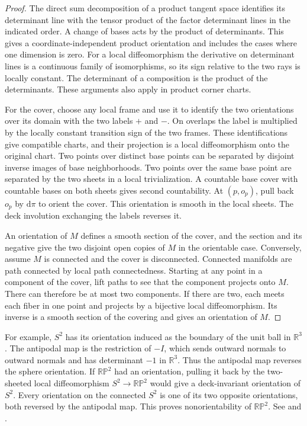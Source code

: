 \documentclass[11pt,oneside,openany]{book}
\theoremstyle{definition}
\theoremstyle{remark}
\newcommand{\R}{\mathbb R}
\newcommand{\dd}{\mathrm d}
\begin{document}
\begin{proof}
The direct sum decomposition of a product tangent space identifies its determinant line with the tensor product of the factor determinant lines in the indicated order. A change of bases acts by the product of determinants. This gives a coordinate-independent product orientation and includes the cases where one dimension is zero. For a local diffeomorphism the derivative on determinant lines is a continuous family of isomorphisms, so its sign relative to the two rays is locally constant. The determinant of a composition is the product of the determinants. These arguments also apply in product corner charts.

For the cover, choose any local frame and use it to identify the two orientations over its domain with the two labels \(+\) and \(-\). On overlaps the label is multiplied by the locally constant transition sign of the two frames. These identifications give compatible charts, and their projection is a local diffeomorphism onto the original chart. Two points over distinct base points can be separated by disjoint inverse images of base neighborhoods. Two points over the same base point are separated by the two sheets in a local trivialization. A countable base cover with countable bases on both sheets gives second countability. At \((p,o_p)\), pull back \(o_p\) by \(\dd\pi\) to orient the cover. This orientation is smooth in the local sheets. The deck involution exchanging the labels reverses it.

An orientation of \(M\) defines a smooth section of the cover, and the section and its negative give the two disjoint open copies of \(M\) in the orientable case. Conversely, assume \(M\) is connected and the cover is disconnected. Connected manifolds are path connected by local path connectedness. Starting at any point in a component of the cover, lift paths to see that the component projects onto \(M\). There can therefore be at most two components. If there are two, each meets each fiber in one point and projects by a bijective local diffeomorphism. Its inverse is a smooth section of the covering and gives an orientation of \(M\).
\end{proof}

For example, \(S^2\) has its orientation induced as the boundary of the unit ball in \(\R^3\). The antipodal map is the restriction of \(-I\), which sends outward normals to outward normals and has determinant \(-1\) in \(\R^3\). Thus the antipodal map reverses the sphere orientation. If \(\mathbb{RP}^2\) had an orientation, pulling it back by the two-sheeted local diffeomorphism \(S^2\to\mathbb{RP}^2\) would give a deck-invariant orientation of \(S^2\). Every orientation on the connected \(S^2\) is one of its two opposite orientations, both reversed by the antipodal map. This proves nonorientability of \(\mathbb{RP}^2\). See \cite[Proposition 15.7 and Theorem 15.41]{lee} and \cite[Section 21]{tu}.
\end{document}
